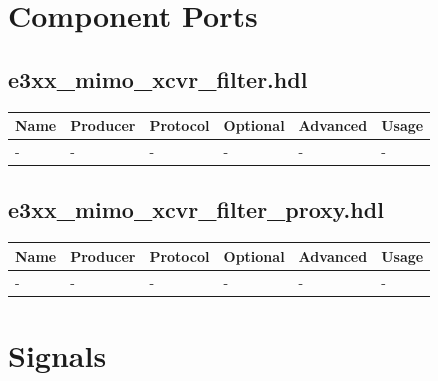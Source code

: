 \documentclass{article}
\def\comp{e3xx\_mimo\_xcvr\_filter}
\def\proxy{e3xx\_mimo\_xcvr\_filter\_proxy}
\begin{document}
\begin{landscape}
\section*{Component Ports}
\subsection*{\comp.hdl}
    \begin{scriptsize}
        \begin{tabular}{|p{2cm}|p{1.5cm}|p{4cm}|p{1.5cm}|p{1.5cm}|p{10.36cm}|}
        \hline
        \rowcolor{blue}
        Name & Producer & Protocol           & Optional & Advanced & Usage                  \\
        \hline
        -    & -        & -                  & -        & -        & - \\
        \hline
        \end{tabular}
	\end{scriptsize}
\subsection*{\proxy.hdl}
    \begin{scriptsize}
        \begin{tabular}{|p{2cm}|p{1.5cm}|p{4cm}|p{1.5cm}|p{1.5cm}|p{10.36cm}|}
        \hline
        \rowcolor{blue}
        Name & Producer & Protocol           & Optional & Advanced & Usage                  \\
        \hline
        -    & -        & -                  & -        & -        & - \\
        \hline
        \end{tabular}
	\end{scriptsize}

\section*{Signals}

\end{landscape}
\end{document}
